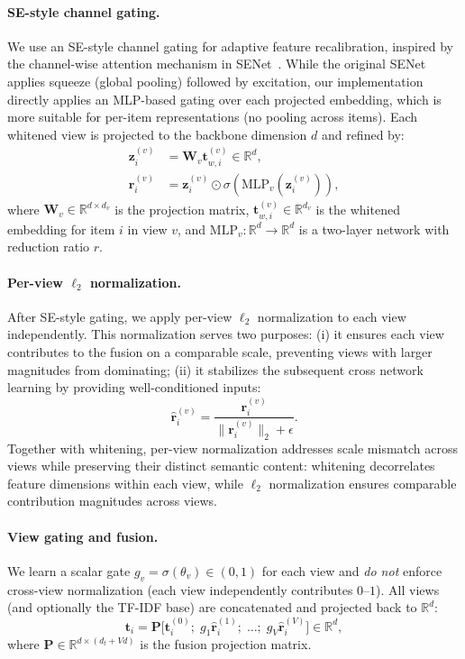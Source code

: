 \documentclass[sigconf,natbib=true,anonymous]{acmart}
\newcommand{\tfidf}{\textsc{TF-IDF}\xspace}
\begin{document}
\paragraph{SE-style channel gating.}
We use an SE-style channel gating for adaptive feature
recalibration, inspired by the channel-wise attention mechanism
in SENet~\cite{hu2018senet}. While the original SENet applies
squeeze (global pooling) followed by excitation, our
implementation directly applies an MLP-based gating over each
projected embedding, which is more suitable for per-item
representations (no pooling across items). Each whitened view
is projected to the backbone dimension $d$ and refined by:
\begin{align}
  \mathbf{z}_i^{(v)} &= \mathbf{W}_v \mathbf{t}_{w,i}^{(v)} \in \mathbb{R}^d,\\
  \mathbf{r}_i^{(v)} &= \mathbf{z}_i^{(v)} \odot \sigma(\mathrm{MLP}_v(\mathbf{z}_i^{(v)})),
\end{align}
where $\mathbf{W}_v \in \mathbb{R}^{d \times d_v}$ is the projection matrix,
$\mathbf{t}_{w,i}^{(v)} \in \mathbb{R}^{d_v}$ is the whitened embedding for
item $i$ in view $v$, and $\mathrm{MLP}_v: \mathbb{R}^d \to \mathbb{R}^d$ is a two-layer
network with reduction ratio $r$.

\paragraph{Per-view $\ell_2$ normalization.}
After SE-style gating, we apply per-view $\ell_2$ normalization
to each view independently. This normalization serves two purposes:
(i) it ensures each view contributes to the fusion on a comparable
scale, preventing views with larger magnitudes from dominating;
(ii) it stabilizes the subsequent cross network learning by
providing well-conditioned inputs:
\begin{equation}
  \hat{\mathbf{r}}_i^{(v)} = \frac{\mathbf{r}_i^{(v)}}{\lVert \mathbf{r}_i^{(v)} \rVert_2 + \epsilon}.
\end{equation}
Together with whitening, per-view normalization addresses scale mismatch
across views while preserving their distinct semantic content: whitening
decorrelates feature dimensions within each view, while $\ell_2$
normalization ensures comparable contribution magnitudes across views.

\paragraph{View gating and fusion.}
We learn a scalar gate $g_v=\sigma(\theta_v)\in(0,1)$ for each
view and \emph{do not} enforce cross-view normalization (each
view independently contributes $0$--$1$). All views (and
optionally the \tfidf base) are concatenated and projected
back to $\mathbb{R}^d$:
\begin{equation}
  \mathbf{t}_i = \mathbf{P}\Big[\mathbf{t}_i^{(0)};\; g_1\hat{\mathbf{r}}_i^{(1)};\; \dots;\; g_V\hat{\mathbf{r}}_i^{(V)}\Big] \in \mathbb{R}^d,
\end{equation}
where $\mathbf{P} \in \mathbb{R}^{d \times (d_t + Vd)}$ is the fusion projection matrix.
\end{document}
